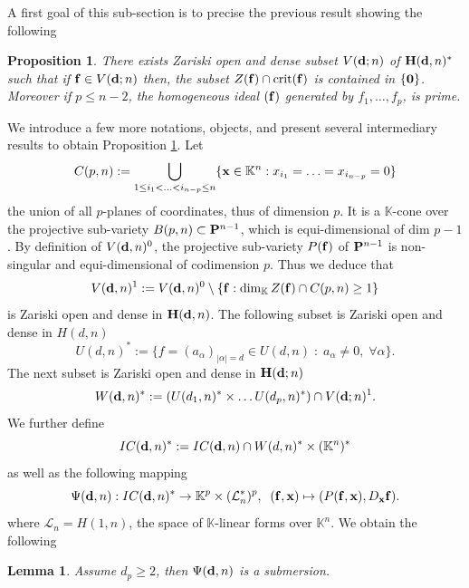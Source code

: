 \documentclass[11pt]{amsart}
\newtheorem{lemma}[theorem]{Lemma}
\newtheorem{proposition}[theorem]{Proposition}
\newcommand{\field}[1]{\mathbb{#1}}
\newcommand{\K}{\field{K}}
\newcommand{\aph}{{\alpha}}
\newcommand{\bbo}{{\bf 0}}
\newcommand{\bd}{{\bf d}}
\newcommand{\bbf}{{\bf f}}
\newcommand{\bH}{{\bf H}}
\newcommand{\bP}{{\bf P}}
\newcommand{\bx}{{\bf x}}
\newcommand{\cL}{\mathcal{L}}
\newcommand{\crit}{{\rm crit}}
\newcommand{\Kn}{{\K^n}}
\numberwithin{equation}{section}
\numberwithin{equation}{section}
\begin{document}
%
%
A first goal of this sub-section is to precise the previous result 
showing the following
%
%
\begin{proposition}\label{prop:CI-homog-gen}
There exists Zariski open and dense subset $V(\bd;n)$ of $\bH(\bd,n)^*$
such that if $\bbf \in V(\bd;n)$ then, the subset $Z(\bbf)\cap \crit(\bbf)$ 
is contained in $\{\bbo\}$. Moreover if $p\leq n-2$, the homogeneous ideal 
$(\bbf)$ generated by $f_1,\ldots,f_p$, is prime.
\end{proposition}
%
%

We introduce a few more notations, objects, and present 
several intermediary results to obtain Proposition \ref{prop:CI-homog-gen}.
Let 
$$
C(p,n) := \bigcup_{1\leq i_1<\ldots<i_{n-p} \leq n} \{\bx \in \Kn : x_{i_1} 
=  \ldots = x_{i_{n-p}} = 0\}
$$
the union of all $p$-planes of coordinates, thus of dimension $p$. 
It is a $\K$-cone over the projective sub-variety $B(p,n) \subset
\bP^{n-1}$, which is equi-dimensional of dim $p-1$. 
By definition of $V(\bd,n)^0$, the projective sub-variety $P(\bbf)$ of 
$\bP^{n-1}$ is non-singular and equi-dimensional of codimension $p$.
Thus we deduce that
$$
V(\bd,n)^1 := V(\bd,n)^0 \setminus \{\bbf : \dim_\K Z(\bbf) \cap C(p,n) \geq 
1\}
$$
is Zariski open and dense in $\bH(\bd,n)$. 
The following subset is Zariski open and dense in $H(d,n)$
$$
U(d,n)^* := \{f = (a_\aph)_{|\aph|=d} \in U(d,n) \; : \; a_\aph \neq 0, 
\; \forall \aph\}.
$$
The next subset is Zariski open and dense in $\bH(\bd;n)$
$$
W(\bd,n)^* := \left(U(d_1,n)^* \times \ldots U(d_p,n)^* \right)
\cap V(\bd;n)^1.
$$
We further define 
$$
IC(\bd,n)^* := IC(\bd,n) \cap W(d,n)^* \times (\Kn)^*
$$
as well as the following mapping
$$
\Psi (\bd,n) :IC(\bd,n)^* \to \K^p \times (\cL_n^*)^p,\;\;
(\bbf,\bx) \mapsto (P(\bbf,\bx),D_\bx\bbf).
$$
where $\cL_n = H(1,n)$, the space of $\K$-linear forms over $\Kn$. 
We obtain the following 
%
%
\begin{lemma}\label{lem:psi-bdn-submers} 
Assume $d_p \geq 2$, then $\Psi (\bd,n)$ is a submersion.
\end{lemma}
%
%
\end{document}
